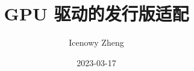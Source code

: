 \documentclass{ctexbeamer}
\title{GPU 驱动的发行版适配}
\author{Icenowy Zheng}
\institute{PLCT 实验室}
\date{2023-03-17}
\begin{document}
\frame{\titlepage}
\end{document}
